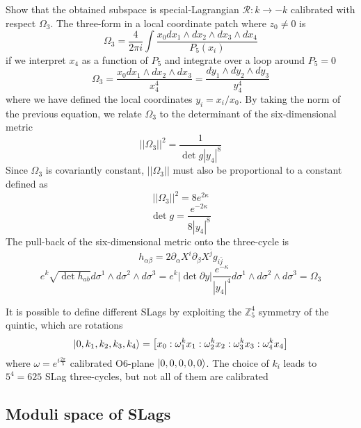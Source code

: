 Show that the obtained subspace is special-Lagrangian
$\mathcal R: k \to -k$
calibrated with respect $\Omega_3$.
The three-form in a local coordinate patch where $z_0\neq0$ is
\begin{equation}
  \Omega_3=\frac{4}{2\pi i}\int \frac{x_0 dx_1\wedge dx_2 \wedge dx_3 \wedge dx_4}{P_5(x_i)}
\end{equation}
if we interpret $x_4$ as a function of $P_5$ and integrate over a loop around $P_5=0$
\begin{equation}
  \Omega_3=\frac{x_0 dx_1\wedge dx_2 \wedge dx_3}{x_4^4}
  =\frac{dy_1\wedge dy_2\wedge dy_3}{y_4^4}
\end{equation}
where we have defined the local coordinates $y_i=x_i/x_0$.
By taking the norm of the previous equation, we relate $\Omega_3$ to the determinant of the 
six-dimensional metric
\begin{equation}
  ||\Omega_3||^2 = \frac{1}{\det g |y_4|^8}
\end{equation}
Since $\Omega_3$ is covariantly constant, $||\Omega_3||$ must also be proportional to a constant defined as
\begin{equation}
  ||\Omega_3||^2 = 8e^{2\kappa}
\end{equation}
\begin{equation}
  \det g = \frac{e^{-2\kappa}}{8|y_4|^8}
\end{equation}
The pull-back of the six-dimensional metric onto the three-cycle is
\begin{equation}
  h_{\alpha\beta}=2\partial_\alpha X^i \partial_\beta X^{\bar j}g_{i\bar j}
\end{equation}
\begin{equation}
  e^k \sqrt{\det h_{ab}}d\sigma^1\wedge d\sigma^2\wedge d\sigma^3
  =e^k |\det \partial y| \frac{e^{-\kappa}}{|y_4|^4}d\sigma^1\wedge d\sigma^2\wedge d\sigma^3=\Omega_3
\end{equation}

It is possible to define different SLags by exploiting the $\mathbb Z_5^4$ symmetry of the quintic,
which are rotations  
\begin{equation}
  \ket{0,k_1,k_2,k_3,k_4} = {\qty[x_0:\omega^k_1 x_1:\omega^k_2 x_2:\omega^k_3 x_3:\omega^k_4 x_4]}
\end{equation}
where $\omega=e^{i\frac{2\pi}{5}}$
calibrated O6-plane $\ket{0,0,0,0,0}$.
The choice of $k_i$ leads to $5^4=625$ SLag three-cycles, but not all of them are calibrated

\subsection{Moduli space of SLags}


